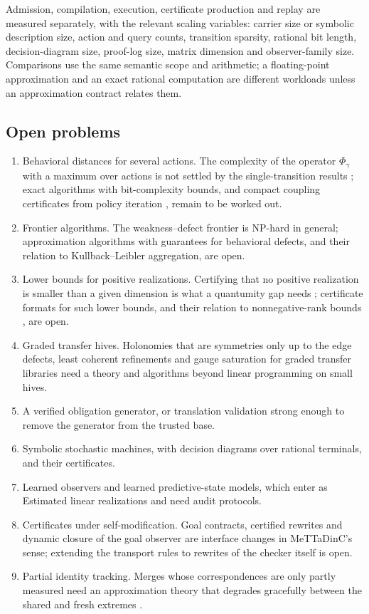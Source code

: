 \documentclass[11pt]{article}
\theoremstyle{definition}
\theoremstyle{plain}
\begin{document}
Admission, compilation, execution, certificate production and replay are measured separately, with
the relevant scaling variables: carrier size or symbolic description size, action and query
counts, transition sparsity, rational bit length, decision-diagram size, proof-log size, matrix
dimension and observer-family size. Comparisons use the same semantic scope and arithmetic; a
floating-point approximation and an exact rational computation are different workloads unless an
approximation contract relates them.

\subsection{Open problems}

\begin{enumerate}
\item Behavioral distances for several actions. The complexity of the operator $\Phi_\gamma$ with a
maximum over actions is not settled by the single-transition results \cite{chenvbw}; exact
algorithms with bit-complexity bounds, and compact coupling certificates from policy iteration
\cite{tangvb,bacci}, remain to be worked out.
\item Frontier algorithms. The weakness--defect frontier is NP-hard in general; approximation
algorithms with guarantees for behavioral defects, and their relation to Kullback--Leibler
aggregation, are open.
\item Lower bounds for positive realizations. Certifying that no positive realization is smaller
than a given dimension is what a quantumity gap needs \cite{quantumity}; certificate formats for such
lower bounds, and their relation to nonnegative-rank bounds \cite{vavasis}, are open.
\item Graded transfer hives. Holonomies that are symmetries only up to the edge defects, least
coherent refinements and gauge saturation for graded transfer libraries need a theory and
algorithms beyond linear programming on small hives.
\item A verified obligation generator, or translation validation strong enough to remove the
generator from the trusted base.
\item Symbolic stochastic machines, with decision diagrams over rational terminals, and their
certificates.
\item Learned observers and learned predictive-state models, which enter as Estimated linear
realizations and need audit protocols.
\item Certificates under self-modification. Goal contracts, certified rewrites and dynamic closure
of the goal observer \cite{goalpreservation} are interface changes in MeTTaDinC's sense; extending the
transport rules to rewrites of the checker itself is open.
\item Partial identity tracking. Merges whose correspondences are only partly measured need an
approximation theory that degrades gracefully between the shared and fresh extremes \cite{aat}.
\end{enumerate}
\end{document}
